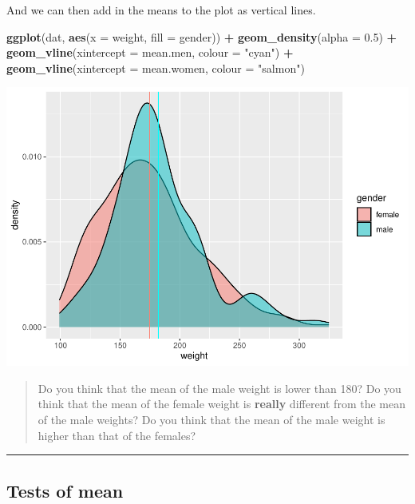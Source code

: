 \documentclass[
]{book}
\newenvironment{Shaded}{\begin{snugshade}}{\end{snugshade}}
\newcommand{\AttributeTok}[1]{\textcolor[rgb]{0.13,0.29,0.53}{#1}}
\newcommand{\FloatTok}[1]{\textcolor[rgb]{0.00,0.00,0.81}{#1}}
\newcommand{\FunctionTok}[1]{\textcolor[rgb]{0.13,0.29,0.53}{\textbf{#1}}}
\newcommand{\NormalTok}[1]{#1}
\newcommand{\SpecialCharTok}[1]{\textcolor[rgb]{0.81,0.36,0.00}{\textbf{#1}}}
\newcommand{\StringTok}[1]{\textcolor[rgb]{0.31,0.60,0.02}{#1}}
\begin{document}
And we can then add in the means to the plot as vertical lines.

\begin{Shaded}
\begin{Highlighting}[]
\FunctionTok{ggplot}\NormalTok{(dat,}
       \FunctionTok{aes}\NormalTok{(}\AttributeTok{x =}\NormalTok{ weight, }
           \AttributeTok{fill =}\NormalTok{ gender)) }\SpecialCharTok{+}
  \FunctionTok{geom\_density}\NormalTok{(}\AttributeTok{alpha =} \FloatTok{0.5}\NormalTok{) }\SpecialCharTok{+}
  \FunctionTok{geom\_vline}\NormalTok{(}\AttributeTok{xintercept =}\NormalTok{ mean.men, }\AttributeTok{colour =} \StringTok{"cyan"}\NormalTok{) }\SpecialCharTok{+}
  \FunctionTok{geom\_vline}\NormalTok{(}\AttributeTok{xintercept =}\NormalTok{ mean.women, }\AttributeTok{colour =} \StringTok{"salmon"}\NormalTok{)}
\end{Highlighting}
\end{Shaded}

\includegraphics{_main_files/figure-latex/unnamed-chunk-120-1.pdf}

\begin{quote}
Do you think that the mean of the male weight is lower than 180?
Do you think that the mean of the female weight is \textbf{really} different from the mean of the male weights?
Do you think that the mean of the male weight is higher than that of the females?
\end{quote}

\begin{center}\rule{0.5\linewidth}{0.5pt}\end{center}

\hypertarget{tests-of-mean}{%
\subsection{Tests of mean}\label{tests-of-mean}}
\end{document}

